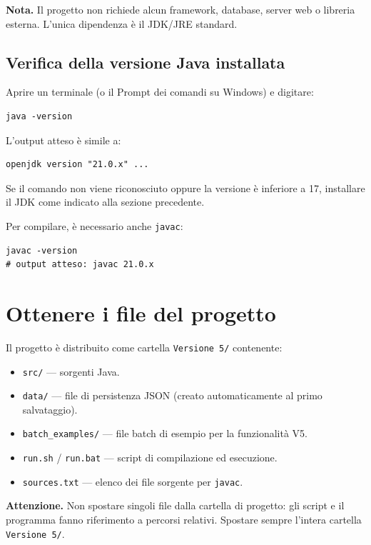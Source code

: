 \documentclass[12pt,a4paper,oneside]{report}
\newcommand{\cmd}[1]{\texttt{\small#1}}
\newcommand{\file}[1]{\texttt{\small#1}}
\begin{document}
\begin{notabox}
\textbf{Nota.} Il progetto non richiede alcun framework, database, server web o libreria esterna. L'unica dipendenza è il JDK/JRE standard.
\end{notabox}

\subsection{Verifica della versione Java installata}
Aprire un terminale (o il Prompt dei comandi su Windows) e digitare:
\begin{lstlisting}[style=bash]
java -version
\end{lstlisting}
L'output atteso è simile a:
\begin{lstlisting}
openjdk version "21.0.x" ...
\end{lstlisting}
Se il comando non viene riconosciuto oppure la versione è inferiore a 17, installare il JDK come indicato alla sezione precedente.

Per compilare, è necessario anche \cmd{javac}:
\begin{lstlisting}[style=bash]
javac -version
# output atteso: javac 21.0.x
\end{lstlisting}

\section{Ottenere i file del progetto}

Il progetto è distribuito come cartella \file{Versione 5/} contenente:
\begin{itemize}
  \item \file{src/} — sorgenti Java.
  \item \file{data/} — file di persistenza JSON (creato automaticamente al primo salvataggio).
  \item \file{batch\_examples/} — file batch di esempio per la funzionalità V5.
  \item \file{run.sh} / \file{run.bat} — script di compilazione ed esecuzione.
  \item \file{sources.txt} — elenco dei file sorgente per \cmd{javac}.
\end{itemize}

\begin{avvisobox}
\textbf{Attenzione.} Non spostare singoli file dalla cartella di progetto: gli script e il programma fanno riferimento a percorsi relativi. Spostare sempre l'intera cartella \file{Versione 5/}.
\end{avvisobox}
\end{document}
